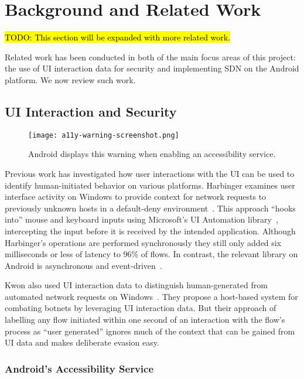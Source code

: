 \section{Background and Related Work}
\label{sec:related-work}

\hl{TODO: This section will be expanded with more related work.}

Related work has been conducted in both of the main focus areas of this project:
the use of UI interaction data for security and implementing SDN on the Android
platform. We now review such work.

\subsection{UI Interaction and Security}
\label{sec:ui-interaction-and-security}

\begin{wrapfigure}{R}{0.4\textwidth}
	\centering
	\texttt{[image: a11y-warning-screenshot.png]}
	\caption{Android displays this warning when enabling an accessibility
		service.}
	\label{fig:a11y-warning}
\end{wrapfigure}

Previous work has investigated how user interactions with the UI can be used to
identify human-initiated behavior on various platforms. Harbinger examines user
interface activity on Windows to provide context for network requests to
previously unknown hosts in a default-deny environment~\cite{chuluundorj2019}.
This approach ``hooks into'' mouse and keyboard inputs using Microsoft's UI
Automation library~\cite{microsoft2018}, intercepting the input before it is
received by the intended application. Although Harbinger's operations are
performed synchronously they still only added six milliseconds or less of
latency to 96\% of flows. In contrast, the relevant library on Android is
asynchronous and event-driven~\cite{googledevelopers2020}.

Kwon \etal also used UI interaction data to distinguish human-generated from
automated network requests on Windows~\cite{kwon2011}. They propose a host-based
system for combating botnets by leveraging UI interaction data. But their
approach of labelling any flow initiated within one second of an interaction
with the flow's process as ``user generated'' ignores much of the context that
can be gained from UI data and makes deliberate evasion easy.

\subsubsection{Android's Accessibility Service}
\label{sec:androids-accessibility-service}

